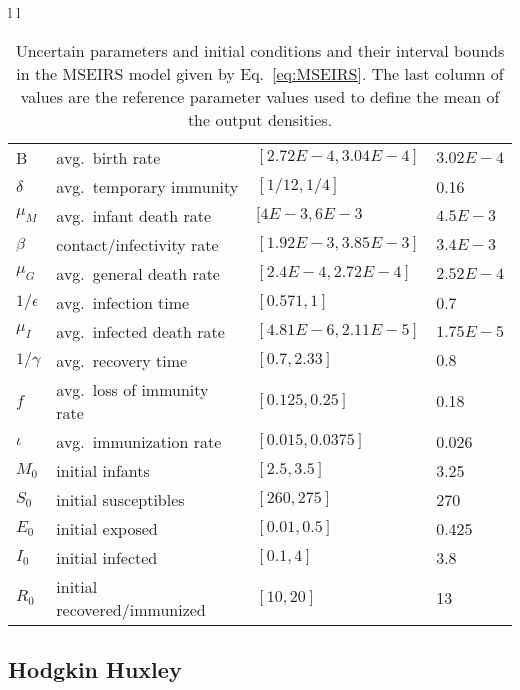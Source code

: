 \documentclass{siamltex}
\begin{document}
\begin{table}[H]
\centering

 \begin{tabular}{l l}

 \begin{tabular}{| l | l | l | l |}
 \hline
 B & avg.~birth rate & $[ 2.72E-4,3.04E-4 ]$    &  $3.02E-4$  \\
 $\delta$ &  avg.~temporary immunity & $[1/12,1/4]$   & 0.16 \\
 $\mu_M$ & avg.~infant death rate & $[4E-3, 6E-3$  &  $4.5E-3$\\
 $\beta$ & contact/infectivity rate & $ [1.92E-3, 3.85E-3]$  & $3.4E-3$ \\
 $\mu_G$ & avg.~general death rate & $[2.4E-4,2.72E-4]$ &  $2.52E-4$\\
 $1/\epsilon$ & avg.~infection time& $[0.571, 1]$ & 0.7\\
 $\mu_I$ & avg.~infected death rate & $[4.81E-6 , 2.11E-5]$ & $1.75E-5$\\
 $1/\gamma$ & avg.~recovery time& $[0.7 , 2.33]$  & $0.8$\\
 $f$ & avg.~loss of immunity rate & $[0.125, 0.25]$ & 0.18\\
 $\iota$ & avg.~immunization rate & $[0.015,0.0375]$ & 0.026\\
 $M_0$ & initial infants & $[2.5,3.5]$ &  3.25 \\
 $S_0$ & initial susceptibles & $[260,275]$ & 270 \\
 $E_0$ & initial exposed & $[0.01,0.5]$& 0.425\\
 $I_0$ &  initial infected & $[0.1,4]$ & 3.8\\
 $R_0$ &  initial recovered/immunized & $[10,20]$ & 13\\
 \hline
 \end{tabular}

 \end{tabular}
 \caption{Uncertain parameters and initial conditions and their interval bounds in the MSEIRS model given by Eq.~\ref{eq:MSEIRS}.
 The last column of values are the reference parameter values used to define the mean of the output densities. }
 \label{tab:MSEIRS_params}
\end{table}


\subsection{Hodgkin Huxley}
\end{document}
